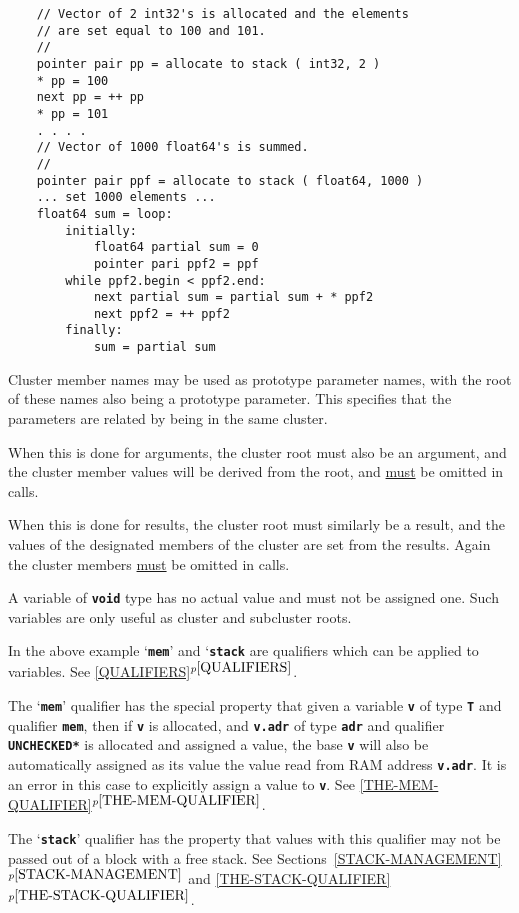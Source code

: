\documentclass[12pt]{article}
\newcommand{\TT}[1]{{\tt \bfseries #1}}
\newcommand{\itemref}[1]{\ref{#1}$^{p\pageref{#1}}$}
\newenvironment{indpar}[1][0.3in]%
	{\begin{list}{}%
		     {\setlength{\itemsep}{0in}%
		      \setlength{\topsep}{0in}%
		      \setlength{\parsep}{1ex}%
		      \setlength{\labelwidth}{#1}%
		      \setlength{\leftmargin}{#1}%
		      \addtolength{\leftmargin}{\labelsep}}%
	 \item}%
	{\end{list}}
\begin{document}
\begin{indpar}
\begin{verbatim}
    // Vector of 2 int32's is allocated and the elements
    // are set equal to 100 and 101.
    //
    pointer pair pp = allocate to stack ( int32, 2 )
    * pp = 100
    next pp = ++ pp
    * pp = 101
    . . . .
    // Vector of 1000 float64's is summed.
    //
    pointer pair ppf = allocate to stack ( float64, 1000 )
    ... set 1000 elements ...
    float64 sum = loop:
        initially:
            float64 partial sum = 0
            pointer pari ppf2 = ppf
        while ppf2.begin < ppf2.end:
            next partial sum = partial sum + * ppf2
            next ppf2 = ++ ppf2
        finally:
            sum = partial sum
\end{verbatim}\end{indpar}

Cluster member names may be used as prototype parameter
names, with the root of these names also being a prototype
parameter.  This specifies that the parameters are related
by being in the same cluster.

When this is done for arguments, the cluster root must
also be an argument, and the cluster member values
will be derived from the root, and \underline{must}
be omitted in calls.

When this is done for results, the cluster root must similarly
be a result, and the values of the designated
members of the cluster are set from the results.
Again the cluster members \underline{must} be omitted in calls.

A variable of \TT{void} type has no actual value
and must not be assigned one.  Such variables are only useful
as cluster and subcluster roots.

In the above example `\TT{mem}' and `\TT{stack} are qualifiers
which can be applied to variables.
See \itemref{QUALIFIERS}.

The `\TT{mem}' qualifier has the special property that given a variable
\TT{v} of type \TT{T} and qualifier \TT{mem}, then if \TT{v} is allocated,
and \TT{v.adr} of type \TT{adr} and qualifier \TT{*UNCHECKED*}
is allocated and
assigned a value, the base \TT{v} will also be automatically
assigned as its value the value read from RAM address \TT{v.adr}.
It is an error in this case to explicitly assign a value to \TT{v}.
See \itemref{THE-MEM-QUALIFIER}.

The `\TT{stack}' qualifier has the property that values with
this qualifier may not be passed out of a block with a free
stack.  See Sections~\itemref{STACK-MANAGEMENT} and
\itemref{THE-STACK-QUALIFIER}.
\end{document}
